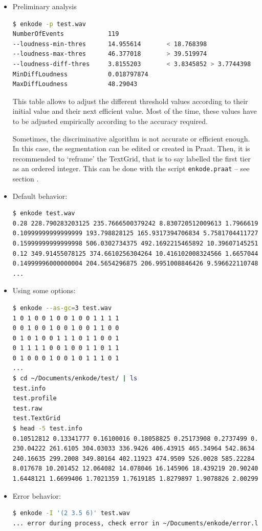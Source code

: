 \begin{itemize}
\item Preliminary analysis
\begin{lstlisting}[language=bash]
$ enkode -p test.wav 
NumberOfEvents            119
--loudness-min-thres      14.955614       < 18.768398
--loudness-max-thres      46.377018       > 39.519974
--loudness-diff-thres     3.8155203       < 3.8345852 > 3.7744398
MinDiffLoudness           0.018797874
MaxDiffLoudness           48.29043
\end{lstlisting}
This table allows to adjust the different threshold values according to their initial value and their next efficient value.
Most of the time, these values have to be adjusted empirically according to the accuracy required.

\smallskip

Sometimes, the discriminative algorithm is not accurate or efficient enough. In this case, the segmentation can be edited or created in Praat. 
Then, it is recommended to `reframe' the TextGrid, that is to say labelled the first tier as an ordered integer. This can be done with the script \texttt{enkode.praat} -- see section .

\item Default behavior:
\begin{lstlisting}[language=bash]
$ enkode test.wav 
0.28 228.790283203125 235.7666500379242 8.830720512009613 1.7966619273740976  
0.10999999999999999 193.798828125 165.9317394706834 5.758170441172713 1.9914783596510206  
0.15999999999999998 506.0302734375 492.1692215465892 10.396071452511483 1.6476902981421457  
0.12 349.91455078125 374.6610256304264 10.416102008324566 1.6657044245205024  
0.14999996000000004 204.5654296875 206.9951008846426 9.59662211074838 1.9097877289745604     
...
\end{lstlisting}
\item Using some options:
\begin{lstlisting}[language=bash]
$ enkode --as-gc=3 test.wav
1 0 1 0 0 1 0 0 1 0 0 1 1 1 1  
0 0 1 0 0 1 0 0 1 0 0 1 1 0 0  
0 1 0 1 0 0 1 1 1 0 1 1 0 0 1  
0 1 1 1 1 0 0 1 0 0 1 1 0 1 1  
0 1 0 0 0 1 0 0 1 0 1 1 1 0 1   
...  
$ cd ~/Documents/enkode/test/ | ls
test.info
test.profile
test.raw	
test.TextGrid
$ head -5 test.info
0.10512812 0.13341777 0.16100016 0.18058825 0.25173908 0.2737499 0.3035293  
230.04222 261.6105 304.03033 336.9426 406.43915 465.34964 542.8634  
240.16635 299.2008 349.80164 402.11923 474.9509 526.0028 585.22284  
8.017678 10.201452 12.064082 14.078046 16.145906 18.439219 20.902403  
1.6448121 1.6699406 1.7021359 1.7619185 1.8279897 1.9078826 2.0029936   
\end{lstlisting}
\item Error behavior:
\begin{lstlisting}[language=bash]
$ enkode -I '(2 3.5 6)' test.wav
... error during process, check error in ~/Documents/enkode/error.log ...
\end{lstlisting}
\end{itemize}

